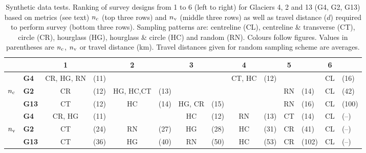 \documentclass[twocolumn,letterpaper]{igs}
\begin{document}
\begin{table}[]
\centering
\caption{Synthetic data tests. Ranking of survey designs from 1 to 6 (left to right) for Glaciers 4, 2 and 13 (G4, G2, G13) based on metrics (see text) $n_{\rm c}$ (top three rows) and $n_{\rm v}$ (middle three rows) as well as travel distance ($d$) required to perform survey (bottom three rows). Sampling patterns are: centreline (CL), centreline \& transverse (CT), circle (CR), hourglass (HG), hourglass \& circle (HC) and random (RN). Colours follow figures. Values in parentheses are $n_{\rm c}$, $n_{\rm v}$ or travel distance (km). Travel distances given for random sampling scheme are averages.}
\label{tab:SynthPatternRanks}
\begin{tabular}{clclclclclclcl}
\hline
          && \textbf{1} && \textbf{2} && \textbf{3} && \textbf{4} && \textbf{5} && \textbf{6} \\
 \hline
                & \textbf{G4}    & \textcolor{CR}{CR}, \textcolor{HG}{HG}, \textcolor{RN}{RN}         & (11)         &          &         & 	& 	&  \textcolor{CT}{CT}, \textcolor{HC}{HC}         & (12)                 &          &  & \textcolor{CL}{CL} & (16) \\
$n_{\rm c}$         & \textbf{G2}   & \textcolor{CR}{CR}         & (12)                   &  \textcolor{HG}{HG}, \textcolor{HC}{HC},\textcolor{CT}{CT}          & (13)         &      &  & &         & \textcolor{RN}{RN}        & (14)  &   \textcolor{CL}{CL} & (42) \\
                & \textbf{G13} & \textcolor{CT}{CT}         & (12)         & \textcolor{HC}{HC} & (14)         &    \textcolor{HG}{HG}, \textcolor{CR}{CR}               & (15)         & & &  \textcolor{RN}{RN}                &        (16)          & \textcolor{CL}{CL} & (100) \\
\hline
                & \textbf{G4}   & \textcolor{CR}{CR},  \textcolor{HG}{HG}         & (11)         &         &           & \textcolor{HC}{HC}         & (12)         & \textcolor{RN}{RN}                 & (13)         & \textcolor{CT}{CT} & (14) & \textcolor{CL}{CL} & (--) \\
$n_{\rm v}$         & \textbf{G2}   & \textcolor{CT}{CT}         & (24)         &  \textcolor{RN}{RN}         & (27)    &	 \textcolor{HG}{HG}  & (28)    & \textcolor{HC}{HC}        & (31)              &  \textcolor{CR}{CR}         & (41) & \textcolor{CL}{CL} & (--) \\
                & \textbf{G13} & \textcolor{CT}{CT}         & (36)         & \textcolor{HG}{HG}         & (40)         & \textcolor{RN}{RN}                 & (50)         &    \textcolor{HC}{HC}      &     (53)     & \textcolor{CR}{CR}         & (102) & \textcolor{CL}{CL} & (--) \\

\end{tabular}
\end{table}
\end{document}
